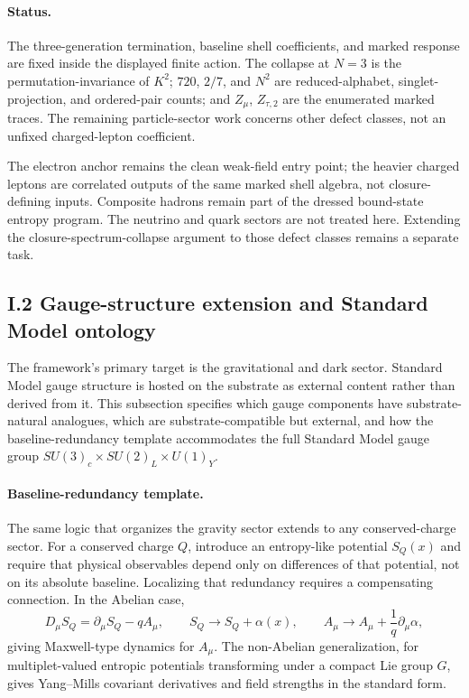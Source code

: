 \documentclass[11pt]{article}
\begin{document}
\paragraph{Status.}
The three-generation termination, baseline shell coefficients, and marked response are fixed inside the displayed finite action. The collapse at $N=3$ is the permutation-invariance of $K^2$; $720$, $2/7$, and $N^2$ are reduced-alphabet, singlet-projection, and ordered-pair counts; and $Z_\mu$, $Z_{\tau,2}$ are the enumerated marked traces. The remaining particle-sector work concerns other defect classes, not an unfixed charged-lepton coefficient.

The electron anchor remains the clean weak-field entry point; the heavier charged leptons are correlated outputs of the same marked shell algebra, not closure-defining inputs. Composite hadrons remain part of the dressed bound-state entropy program. The neutrino and quark sectors are not treated here. Extending the closure-spectrum-collapse argument to those defect classes remains a separate task.

\subsection*{I.2 Gauge-structure extension and Standard Model ontology}

The framework's primary target is the gravitational and dark sector. Standard Model gauge structure is hosted on the substrate as external content rather than derived from it. This subsection specifies which gauge components have substrate-natural analogues, which are substrate-compatible but external, and how the baseline-redundancy template accommodates the full Standard Model gauge group $SU(3)_c\times SU(2)_L\times U(1)_Y$.

\paragraph{Baseline-redundancy template.}
The same logic that organizes the gravity sector extends to any conserved-charge sector. For a conserved charge $Q$, introduce an entropy-like potential $S_Q(x)$ and require that physical observables depend only on differences of that potential, not on its absolute baseline. Localizing that redundancy requires a compensating connection. In the Abelian case,
\[
D_\mu S_Q=\partial_\mu S_Q-qA_\mu,
\qquad
S_Q\to S_Q+\alpha(x),
\qquad
A_\mu\to A_\mu+\frac{1}{q}\partial_\mu\alpha,
\]
giving Maxwell-type dynamics for $A_\mu$. The non-Abelian generalization, for multiplet-valued entropic potentials transforming under a compact Lie group $G$, gives Yang--Mills covariant derivatives and field strengths in the standard form.
\end{document}
